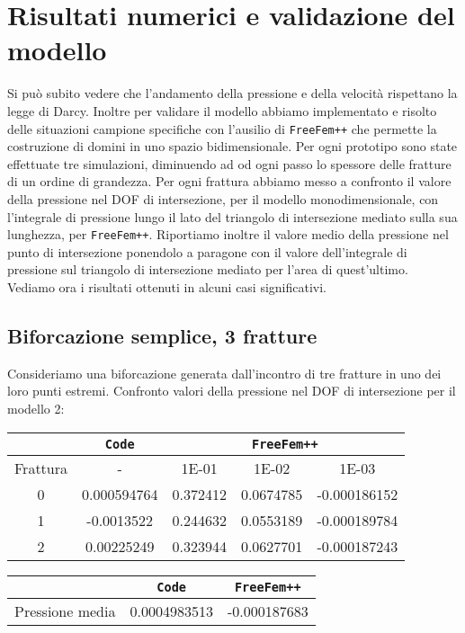 \chapter{Risultati numerici e validazione del modello} 
Si pu\`{o} subito vedere che l'andamento della pressione e della velocit\`{a} rispettano la legge di Darcy.
Inoltre per validare il modello abbiamo implementato e risolto delle situazioni campione specifiche con l'ausilio di \texttt{FreeFem++} che permette la costruzione di domini in uno spazio bidimensionale. Per ogni prototipo sono state effettuate tre simulazioni, diminuendo ad od ogni passo lo spessore delle fratture di un ordine di grandezza. 
Per ogni frattura abbiamo messo a confronto il valore della pressione nel DOF di intersezione, per il modello monodimensionale, con l'integrale di pressione lungo il lato del triangolo di intersezione mediato sulla sua lunghezza, per \texttt{FreeFem++}.
Riportiamo inoltre il valore medio della pressione nel punto di intersezione ponendolo a paragone con il valore dell'integrale di pressione sul triangolo di intersezione mediato per l'area di quest'ultimo.\\
Vediamo ora i risultati ottenuti in alcuni casi significativi.
\section{Biforcazione semplice, 3 fratture}
Consideriamo una biforcazione generata dall'incontro di tre fratture in uno dei loro punti estremi.
Confronto valori della pressione nel DOF di intersezione per il modello 2:\\
\begin{center}
\begin{tabular}{|c|c|c|c|c|}
\hline
 & \textbf{\texttt{Code}} & \multicolumn{3}{|c|}{\textbf{\texttt{FreeFem++}}} \\
\hline
\multicolumn{1}{|c|}{Frattura} & - &
\multicolumn{1}{|c|}{1E-01} & 1E-02 & 1E-03 \\
\hline
 0 & 0.000594764 & 0.372412 & 0.0674785 & -0.000186152\\
 1 & -0.0013522 & 0.244632 & 0.0553189 & -0.000189784\\
 2 & 0.00225249 & 0.323944 & 0.0627701 & -0.000187243\\
\hline
\end{tabular}
\end{center}

\begin{center}
\begin{tabular}{|c|c|c|}
\hline
 & \textbf{\texttt{Code}} & \multicolumn{1}{|c|}{\textbf{\texttt{FreeFem++}}} \\
\hline
 Pressione media & 0.0004983513 & -0.000187683\\
\hline
\end{tabular}
\end{center}

